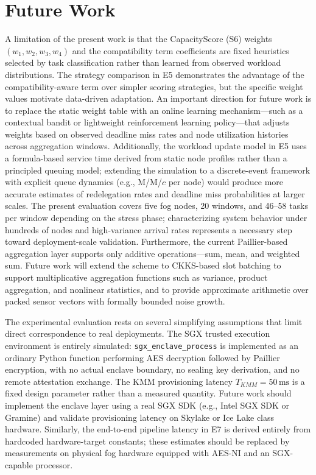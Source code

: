 \documentclass[conference]{IEEEtran}
\begin{document}
    \section{Future Work}

    A limitation of the present work is that the CapacityScore (S6) weights $(w_1, w_2, w_3, w_4)$ and the compatibility term coefficients are fixed heuristics selected by task classification rather than learned from observed workload distributions. The strategy comparison in E5 demonstrates the advantage of the compatibility-aware term over simpler scoring strategies, but the specific weight values motivate data-driven adaptation. An important direction for future work is to replace the static weight table with an online learning mechanism---such as a contextual bandit or lightweight reinforcement learning policy---that adjusts weights based on observed deadline miss rates and node utilization histories across aggregation windows. Additionally, the workload update model in E5 uses a formula-based service time derived from static node profiles rather than a principled queuing model; extending the simulation to a discrete-event framework with explicit queue dynamics (e.g., M/M/$c$ per node) would produce more accurate estimates of redelegation rates and deadline miss probabilities at larger scales. The present evaluation covers five fog nodes, 20 windows, and 46--58 tasks per window depending on the stress phase; characterizing system behavior under hundreds of nodes and high-variance arrival rates represents a necessary step toward deployment-scale validation. Furthermore, the current Paillier-based aggregation layer supports only additive operations---sum, mean, and weighted sum. Future work will extend the scheme to CKKS-based slot batching to support multiplicative aggregation functions such as variance, product aggregation, and nonlinear statistics, and to provide approximate arithmetic over packed sensor vectors with formally bounded noise growth.

    The experimental evaluation rests on several simplifying assumptions that limit direct correspondence to real deployments. The SGX trusted execution environment is entirely simulated: \texttt{sgx\_enclave\_process} is implemented as an ordinary Python function performing AES decryption followed by Paillier encryption, with no actual enclave boundary, no sealing key derivation, and no remote attestation exchange. The KMM provisioning latency $T_{KMM}=50\,\text{ms}$ is a fixed design parameter rather than a measured quantity. Future work should implement the enclave layer using a real SGX SDK (e.g., Intel SGX SDK or Gramine) and validate provisioning latency on Skylake or Ice Lake class hardware. Similarly, the end-to-end pipeline latency in E7 is derived entirely from hardcoded hardware-target constants; these estimates should be replaced by measurements on physical fog hardware equipped with AES-NI and an SGX-capable processor.
\end{document}
